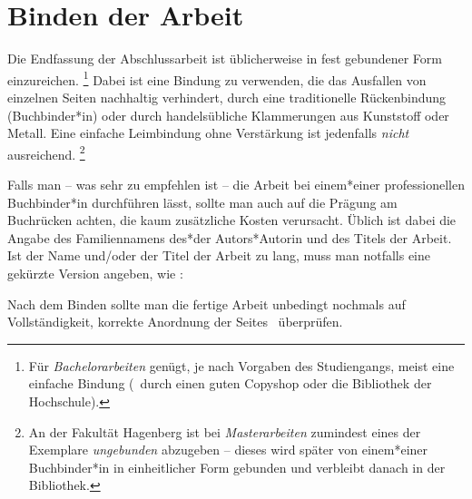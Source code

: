 \section{Binden der Arbeit}

Die Endfassung der Abschlussarbeit ist üblicherweise in fest gebundener Form
einzureichen.%
\footnote{Für \emph{Bachelorarbeiten} genügt, je nach Vorgaben des
Studiengangs, meist eine einfache Bindung (\zB\ durch einen guten Copyshop
oder die Bibliothek der Hochschule).}
Dabei ist eine Bindung zu verwenden, die das Ausfallen von einzelnen Seiten
nachhaltig verhindert, \zB durch eine traditionelle Rückenbindung
(Buchbinder*in) oder durch handelsübliche Klammerungen aus Kunststoff oder
Metall. Eine einfache Leimbindung ohne Verstärkung ist jedenfalls
\emph{nicht} ausreichend.%
\footnote{An der Fakultät Hagenberg ist bei \emph{Masterarbeiten} zumindest
eines der Exemplare \emph{ungebunden} abzugeben -- dieses wird später von
einem*einer Buchbinder*in in einheitlicher Form gebunden und verbleibt danach
in der Bibliothek.}

Falls man -- was sehr zu empfehlen ist -- die Arbeit bei einem*einer
professionellen Buchbinder*in durchführen lässt, sollte man auch auf die
Prägung am Buchrücken achten, die kaum zusätzliche Kosten verursacht. Üblich
ist dabei die Angabe des Familiennamens des*der Autors*Autorin und des Titels
der Arbeit. Ist der Name und/oder der Titel der Arbeit zu lang, muss man 
notfalls eine gekürzte Version angeben, wie \zB:
%
\begin{center}
	\setlength{\fboxsep}{3mm}
\end{center}
%
Nach dem Binden sollte man die fertige Arbeit unbedingt nochmals auf 
Vollständigkeit, korrekte Anordnung der Seites \etc\ überprüfen.
